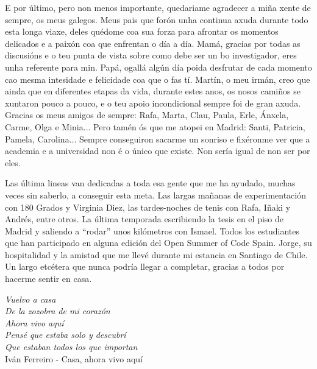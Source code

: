 \begin{acknowledgementslong}
E por último, pero non menos importante, quedariame agradecer a miña xente de sempre, os meus galegos. Meus pais que forón unha continua axuda durante todo esta longa viaxe, deles quédome coa sua forza para afrontar os momentos delicados e a paixón coa que enfrentan o día a día. Mamá, gracias por todas as discusións e o teu punta de vista sobre como debe ser un bo investigador, eres unha referente para min. Papá, ogallá algún día poida desfrutar de cada momento cao mesma intesidade e felicidade coa que o fas tí. Martín, o meu irmán, creo que ainda que en diferentes etapas da vida, durante estes anos, os nosos camiños se xuntaron pouco a pouco, e o teu apoio incondicional sempre foi de gran axuda. Gracias os meus amigos de sempre: Rafa, Marta, Clau, Paula, Erle, Ánxela, Carme, Olga e Minia... Pero tamén ós que me atopei en Madrid: Santi, Patricia, Pamela, Carolina... Sempre conseguiron sacarme un sonriso e fixéronme ver que a academia e a universidad non é o único que existe. Non sería igual de non ser por eles.

Las última lineas van dedicadas a toda esa gente que me ha ayudado, muchas veces sin saberlo, a conseguir esta meta. Las largas mañanas de experimentación con 180 Grados y Virginia Diez, las tardes-noches de tenis con Rafa, Iñaki y Andrés, entre otros. La última temporada escribiendo la tesis en el piso de Madrid y saliendo a ``rodar'' unos kilómetros con Ismael. Todos los estudiantes que han participado en alguna edición del Open Summer of Code Spain. Jorge, su hospitalidad y la amistad que me llevé durante mi estancia en Santiago de Chile. Un largo etcétera que nunca podría llegar a completar, gracias a todos por hacerme sentir en casa.

\vspace{10mm}

\textit{
\null\hfill Vuelvo a casa \\
\null\hfill De la zozobra de mi corazón \\
\null\hfill Ahora vivo aquí \\
\null\hfill Pensé que estaba solo y descubrí \\
\null\hfill Que estaban todos los que importan \vspace{6mm} \\
} 
\null\hfill Iván Ferreiro - Casa, ahora vivo aquí

\end{acknowledgementslong}




